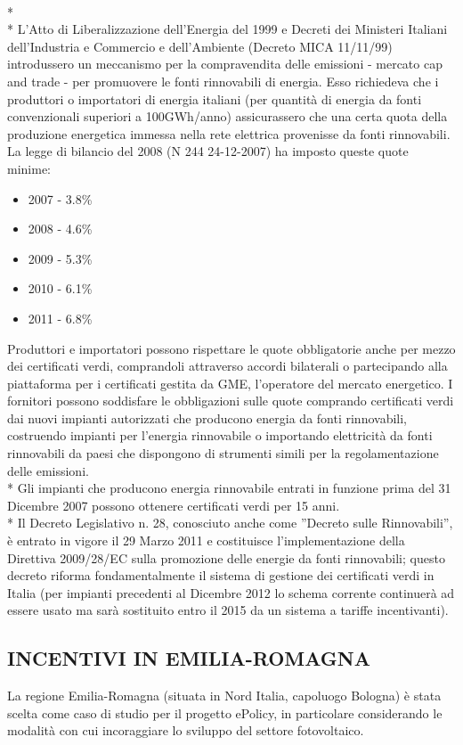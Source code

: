 \documentclass[12pt,a4paper,openright,twoside]{report}
\begin{document}
\\*\\*
L'Atto di Liberalizzazione dell'Energia del 1999 e Decreti dei Ministeri Italiani dell'Industria e Commercio e dell'Ambiente (Decreto MICA 11/11/99) introdussero un meccanismo per la compravendita delle emissioni - mercato cap and trade - per promuovere le fonti rinnovabili di energia. Esso richiedeva che i produttori o importatori di energia italiani (per quantità di energia da fonti convenzionali superiori a 100GWh/anno) assicurassero che una certa quota della produzione energetica immessa nella rete elettrica provenisse da fonti rinnovabili. La legge di bilancio del 2008 (N 244 24-12-2007) ha imposto queste quote minime: 
\begin{itemize}
\item 2007 - 3.8\%
\item 2008 - 4.6\%
\item 2009 - 5.3\%
\item 2010 - 6.1\%
\item 2011 - 6.8\%
\end{itemize}
Produttori e importatori possono rispettare le quote obbligatorie anche per mezzo dei certificati verdi, comprandoli attraverso accordi bilaterali o partecipando alla piattaforma per i certificati gestita da GME, l'operatore del mercato energetico. I fornitori possono soddisfare le obbligazioni sulle quote comprando certificati verdi dai nuovi impianti autorizzati che producono energia da fonti rinnovabili, costruendo impianti per l'energia rinnovabile o importando elettricità da fonti rinnovabili da paesi che dispongono di strumenti simili per la regolamentazione delle emissioni.\\*
Gli impianti che producono energia rinnovabile entrati in funzione prima del 31 Dicembre 2007 possono ottenere certificati verdi per 15 anni.\\*
Il Decreto Legislativo n. 28, conosciuto anche come ''Decreto sulle Rinnovabili'', è entrato in vigore il 29 Marzo 2011 e costituisce l'implementazione della Direttiva 2009/28/EC sulla promozione delle energie da fonti rinnovabili; questo decreto riforma fondamentalmente il sistema di gestione dei certificati verdi in Italia (per impianti precedenti al Dicembre 2012 lo schema corrente continuerà ad essere usato ma sarà sostituito entro il 2015 da un sistema a tariffe incentivanti).

\subsection[INCENTIVI REGIONALI]{\nohyphens{INCENTIVI IN EMILIA-ROMAGNA}}
La regione Emilia-Romagna (situata in Nord Italia, capoluogo Bologna) è stata scelta come caso di studio per il progetto ePolicy, in particolare considerando le modalità con cui incoraggiare lo sviluppo del settore fotovoltaico. 
\end{document}
